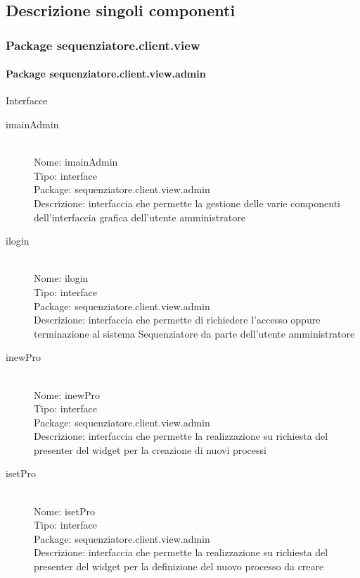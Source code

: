 \subsection{Descrizione singoli componenti}
\subsubsection{Package sequenziatore.client.view}
\paragraph{Package sequenziatore.client.view.admin}
Interfacce \\
\begin{description}
	\item[imainAdmin] 
  	\hfill \\
  	Nome: imainAdmin\\
  	Tipo: interface\\
	Package: sequenziatore.client.view.admin\\
	Descrizione: interfaccia che permette la gestione delle varie componenti 	dell'interfaccia grafica dell'utente amministratore
\end{description}

\begin{description}
	\item[ilogin] 
  	\hfill \\
  	Nome: ilogin\\
  	Tipo: interface\\
	Package: sequenziatore.client.view.admin\\
	Descrizione: interfaccia che permette di richiedere l'accesso oppure terminazione al sistema Sequenziatore da parte dell’utente amministratore
\end{description}

\begin{description}
	\item[inewPro] 
  	\hfill \\
  	Nome: inewPro\\
  	Tipo: interface\\
	Package: sequenziatore.client.view.admin\\
	Descrizione: interfaccia che permette la realizzazione su richiesta del presenter del widget per la creazione di nuovi processi
\end{description}

\begin{description}
	\item[isetPro] 
  	\hfill \\
  	Nome: isetPro\\
  	Tipo: interface\\
	Package: sequenziatore.client.view.admin\\
	Descrizione: interfaccia che permette la realizzazione su richiesta del presenter del widget per la definizione del nuovo processo da creare
\end{description}

